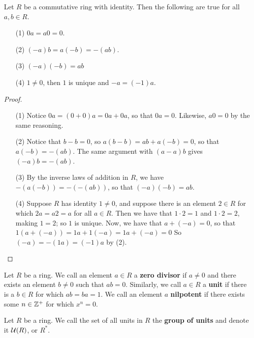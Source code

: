 \begin{lemma}\label{1.1.1}
    Let $R$ be a commutative ring with identity. Then the following are true for
    all $a,b \in R$.
    \begin{enumerate}
        \item[(1)] $0a=a0=0$.

        \item[(2)] $(-a)b=a(-b)=-(ab)$.

        \item[(3)] $(-a)(-b)=ab$

        \item[(4)] $1 \neq 0$, then $1$ is unique and $-a=(-1)a$.
    \end{enumerate}
\end{lemma}
\begin{proof}
    \begin{enumerate}
        \item[(1)] Notice $0a=(0+0)a=0a+0a$, so that $0a=0$. Likewise, $a0=0$ by
            the same reasoning.

        \item[(2)] Notice that $b-b=0$, so $a(b-b)=ab+a(-b)=0$, so that
            $a(-b)=-(ab)$. The same argument with $(a-a)b$ gives $(-a)b=-(ab)$.

        \item[(3)] By the inverse laws of addition in $R$, we have
            $-(a(-b))=-(-(ab))$, so that $(-a)(-b)=ab$.

    \item[(4)] Suppose $R$ has identity $1 \neq 0$, and suppose there is an
        element $2 \in R$ for which  $2a=a2=a$ for all $a \in R$. Then we have
        that $1 \cdot 2=1$ and  $1 \cdot 2=2$, making  $1=2$; so  $1$ is unique.
        Now, we have that $a+(-a)=0$, so that $1(a+(-a))=1a+1(-a)=1a+(-a)=0$ So
        $(-a)=-(1a)=(-1)a$ by (2).
    \end{enumerate}
\end{proof}

\begin{definition}
    Let $R$ be a ring. We call an element  $a \in R$ a  \textbf{zero divisor} if
    $a \neq 0$ and there exists an element  $b \neq 0$ such that  $ab=0$.
    Similarly, we call $a \in R$ a \textbf{unit} if there is a $b \in R$ for
    which  $ab=ba=1$. We call an element $a$  \textbf{nilpotent} if there exists
    some $n \in \mathbb{Z}^+$ for which $x^n=0$.
\end{definition}

\begin{definition}
    Let $R$ be a ring. We call the set of all units in  $R$ the \textbf{group
    of units} and denote it $\mathcal{U}(R)$, or $R^\ast$.
\end{definition}

